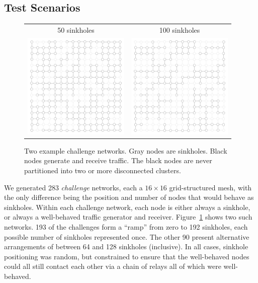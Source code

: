 \documentclass{article}
\begin{document}
\subsection{Test Scenarios}

\begin{figure}[b!]
\centering
\begin{tabular}{c@{\qquad}c}
50 sinkholes&100 sinkholes\\
\includegraphics[width=2in]{figures/fifty}&
\includegraphics[width=2in]{figures/hundred}\\
\end{tabular}
\caption{Two example challenge networks.  Gray nodes are
  sinkholes. Black nodes generate and receive traffic.  The black
  nodes are never partitioned into two or more disconnected
  clusters.}\label{f:chal}
\end{figure}

We generated 283 \emph{challenge} networks, each a $16 \times 16$
grid-structured mesh, with the only difference being the position and
number of nodes that would behave as sinkholes.  Within each challenge
network, each node is either always a sinkhole, or always a
well-behaved traffic generator and receiver.  Figure~\ref{f:chal}
shows two such networks.  193 of the challenges form a “ramp” from
zero to 192 sinkholes, each possible number of sinkholes represented
once.  The other 90 present alternative arrangements of between 64 and
128 sinkholes (inclusive).  In all cases, sinkhole positioning was
random, but constrained to ensure that the well-behaved nodes could
all still contact each other via a chain of relays all of which were
well-behaved.
\end{document}

